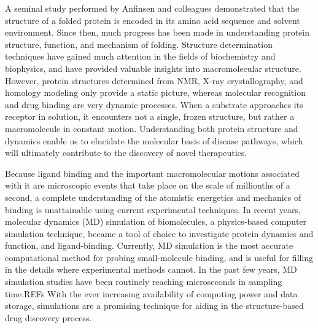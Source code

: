 
A seminal study performed by Anfinsen and colleagues demonstrated that the structure of a folded protein is encoded in its amino acid sequence and solvent environment.\cite{Anfinsen:1973vt} Since then, much progress has been made in understanding protein structure, function, and mechanism of folding.\cite{Dill:2012ce} Structure determination techniques have gained much attention in the fields of biochemistry and biophysics, and have provided valuable insights into macromolecular structure. However, protein structures determined from NMR, X-ray crystallography, and homology modeling only provide a static picture, whereas molecular recognition and drug binding are very dynamic processes. When a substrate approaches its receptor in solution, it encounters not a single, frozen structure, but rather a macromolecule in constant motion. Understanding both protein structure and dynamics enable us to elucidate the molecular basis of disease pathways, which will ultimately contribute to the discovery of novel therapeutics. 

Because ligand binding and the important macromolecular motions associated with it are microscopic events that take place on the scale of millionths of a second, a complete understanding of the atomistic energetics and mechanics of binding is unattainable using current experimental techniques. In recent years, molecular dynamics (MD) simulation of biomolecules, a physics-based computer simulation technique, became a tool of choice to investigate protein dynamics and function, and ligand-binding.\cite{Durrant:2011bm,Karplus:2002wt} Currently, MD simulation is the most accurate computational method for probing small-molecule binding, and is useful for filling in the details where experimental methods cannot.\cite{Durrant:2011bm} In the past few years, MD simulation studies have been routinely reaching microseconds in sampling time.REFs With the ever increasing availability of computing power and data storage, simulations are a promising technique for aiding in the structure-based drug discovery process.\cite{Durrant:2011bm}

